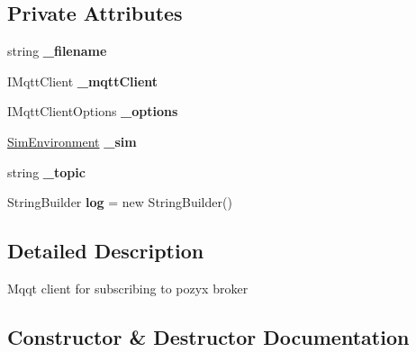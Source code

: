 \subsection*{Private Attributes}
\begin{DoxyCompactItemize}
\item 
\mbox{\label{class_pozyx_positioner_1_1_framework_1_1_mqtt_client_affc988c8046e844a8814a33dcc7ae611}} 
string {\bfseries \+\_\+filename}
\item 
\mbox{\label{class_pozyx_positioner_1_1_framework_1_1_mqtt_client_a3bef7957deec9a68cf853c17555a4f85}} 
I\+Mqtt\+Client {\bfseries \+\_\+mqtt\+Client}
\item 
\mbox{\label{class_pozyx_positioner_1_1_framework_1_1_mqtt_client_abb53312377599059079ab76f8299599e}} 
I\+Mqtt\+Client\+Options {\bfseries \+\_\+options}
\item 
\mbox{\label{class_pozyx_positioner_1_1_framework_1_1_mqtt_client_a65faa3911fc07423829583320c96ab59}} 
\hyperlink{class_pozyx_positioner_1_1_framework_1_1_sim_environment}{Sim\+Environment} {\bfseries \+\_\+sim}
\item 
\mbox{\label{class_pozyx_positioner_1_1_framework_1_1_mqtt_client_a6ea2bbc30c60ba16cd972acfb64beea3}} 
string {\bfseries \+\_\+topic}
\item 
\mbox{\label{class_pozyx_positioner_1_1_framework_1_1_mqtt_client_a7dbee0133f3ec032ceffa37c73525aaa}} 
String\+Builder {\bfseries log} = new String\+Builder()
\end{DoxyCompactItemize}


\subsection{Detailed Description}
Mqqt client for subscribing to pozyx broker 



\subsection{Constructor \& Destructor Documentation}
\mbox{\label{class_pozyx_positioner_1_1_framework_1_1_mqtt_client_a4e2ab3ac03e686e3b85fe50d1a02feb8}} 
